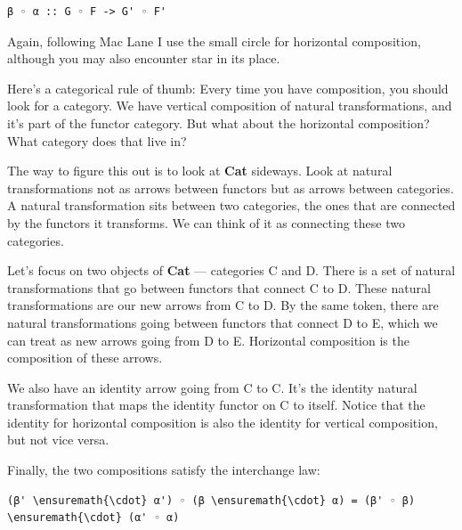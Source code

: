 \begin{Verbatim}[commandchars=\\\{\}]
β ◦ α :: G ◦ F -> G' ◦ F'
\end{Verbatim}
Again, following Mac Lane I use the small circle for horizontal
composition, although you may also encounter star in its place.

Here's a categorical rule of thumb: Every time you have composition, you
should look for a category. We have vertical composition of natural
transformations, and it's part of the functor category. But what about
the horizontal composition? What category does that live in?

The way to figure this out is to look at \textbf{Cat} sideways. Look at
natural transformations not as arrows between functors but as arrows
between categories. A natural transformation sits between two
categories, the ones that are connected by the functors it transforms.
We can think of it as connecting these two categories.

\begin{figure}[H]
\centering
{}
\end{figure}

\noindent
Let's focus on two objects of \textbf{Cat} --- categories C and D. There
is a set of natural transformations that go between functors that
connect C to D. These natural transformations are our new arrows from C
to D. By the same token, there are natural transformations going between
functors that connect D to E, which we can treat as new arrows going
from D to E. Horizontal composition is the composition of these arrows.

We also have an identity arrow going from C to C. It's the identity
natural transformation that maps the identity functor on C to itself.
Notice that the identity for horizontal composition is also the identity
for vertical composition, but not vice versa.

Finally, the two compositions satisfy the interchange law:

\begin{Verbatim}[commandchars=\\\{\}]
(β' \ensuremath{\cdot} α') ◦ (β \ensuremath{\cdot} α) = (β' ◦ β) \ensuremath{\cdot} (α' ◦ α)
\end{Verbatim}

